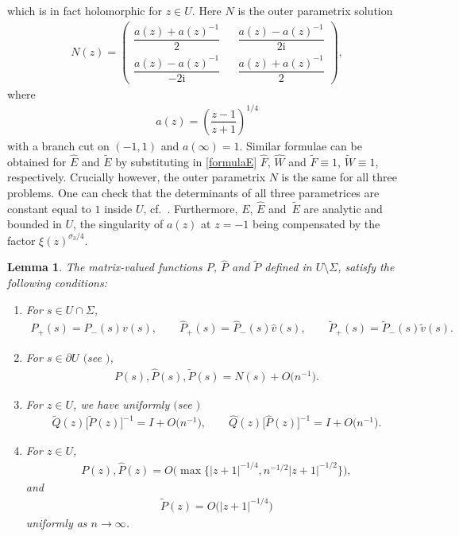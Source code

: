 \documentclass[11pt]{article}
\numberwithin{equation}{section}
\newcommand{\Id}{I}
\newcommand{\hQ}{{\widehat Q}}
\newcommand{\tQ}{{\widetilde Q}}
\newcommand{\bP}{P}
\newcommand{\hP}{{\widehat P}}
\newcommand{\tP}{{\widetilde P}}
\newcommand{\bv}{v}
\newcommand{\hv}{{\widehat v}}
\newcommand{\tv}{{\widetilde v}}
\newcommand{\hF}{\widehat F}
\newcommand{\I}{\mathrm{i}}
\newtheorem{Lemma}[Theorem]{Lemma}
\numberwithin{equation}{section}
\begin{document}
which is in fact holomorphic for $z \in U$.
 Here $N$ is the outer parametrix solution
 \begin{align}\label{OuterParametrix}
 N(z) = \begin{pmatrix}
\dfrac{a(z)+a(z)^{-1}}{2} && \dfrac{a(z)- a(z)^{-1}}{2\I}
\\
\dfrac{a(z)- a(z)^{-1}}{-2\I} && \dfrac{a(z)+a(z)^{-1}}{2}
\end{pmatrix},
\end{align}
where
\begin{align*}
a(z) = \left( \dfrac{z-1}{z+1} \right)^{1/4}
\end{align*}
with a branch cut on $(-1,1)$ and $a(\infty) = 1$. Similar formulae can be obtained for $\widehat E$ and $\widetilde E$ by substituting in \eqref{formulaE} $\hF$, $\widehat W$ and $\widetilde F \equiv 1$, $\widetilde W \equiv 1$, respectively. Crucially however, the outer parametrix $N$ is the same for all three problems. One can check that the determinants of all three parametrices are constant equal to $1$ inside $U$, cf.\ \cite[Section~7]{KMVV}. Furthermore, $E$, $\widehat E$ and~$\widetilde E$ are analytic and bounded in $U$, the singularity of $a(z)$ at $z =-1$ being compensated by the factor $\xi(z)^{\sigma_3/4}$.
\begin{Lemma}\label{PropP}
The matrix-valued functions $\bP$, $\hP$ and $\tP$ defined in $U \setminus \Sigma$, satisfy the following conditions:
\begin{enumerate}[$(i)$]\itemsep=0pt
 \item For $s \in U\cap \Sigma$,
 \begin{align} \label{ParametrixJump}
 \bP_+(s) = \bP_-(s) \bv(s), \qquad
 \hP_+(s) = \hP_-(s) \hv(s), \qquad
 \tP_+(s) = \tP_-(s) \tv(s).
 \end{align}
 \item For $s \in \partial U$ $($see \emph{\cite[equation~(6.41)]{KMVV}}$)$,
 \begin{align}\label{ParaMatchingCond}
 \bP(s), \hP(s), \tP(s) = N(s) + O\big(n^{-1}\big).
 \end{align}
\item For $z \in U$, we have uniformly $($see \emph{\cite[equation~(7.10)]{KMVV}}$)$
\begin{align} \label{ParaConv}
 \tQ(z) \big[\tP(z)\big]^{-1} = \Id + O\big(n^{-1}\big), \qquad \hQ(z) \big[\hP(z)\big]^{-1} = \Id + O\big(n^{-1}\big).
\end{align}
\item For $z \in U$,
\begin{align}\label{ParaBehaviour}
 \bP(z), \hP(z) = O\big(\max\big\lbrace |z+1|^{-1/4}, n^{-1/2} |z+1|^{-1/2}\big\rbrace\big),
\end{align}
and
\begin{align}\label{LegendreBehaviour}
 \tP(z) = O\big(|z+1|^{-1/4}\big)
\end{align}
uniformly as $n \to \infty$.
\end{enumerate}
\end{Lemma}
\end{document}
